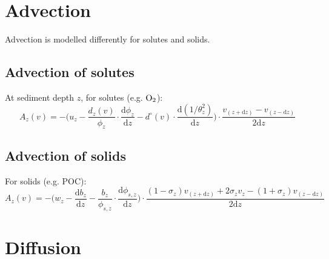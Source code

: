 \documentclass[a4paper]{article}
\newcommand{\D}[1]{\mathrm{d}#1}
\newcommand{\dydx}[2]{\frac{\D{#1}}{\D{#2}}}
\begin{document}

\section{Advection}\label{sx:advection}

Advection is modelled differently for solutes and solids.


\subsection{Advection of solutes}

At sediment depth $z$, for solutes (e.g. $\ce{O2}$):
\begin{equation}
A_z(v) = -\Bigg( u_z - \frac{d_z(v)}{\phi_z} \cdot \dydx{\phi_z}{z} - d^\circ(v) \cdot \dydx{(1/\theta_z^2)}{z} \Bigg) \cdot \frac{v_{(z+\D{z})} - v_{(z-\D{z})}}{2\D{z}}
\end{equation}


\subsection{Advection of solids}

For solids (e.g. POC):
\begin{equation}
A_z(v) = -\Bigg( w_z - \dydx{b_z}{z} - \frac{b_z}{\phi_{s,z}} \cdot \dydx{\phi_{s,z}}{z} \Bigg) \cdot \frac{(1 - \sigma_z) v_{(z+\D{z})} + 2 \sigma_z v_z - (1 + \sigma_z) v_{(z-\D{z})}}{2\D{z}}
\end{equation}


\section{Diffusion}\label{sx:diffusion}
\end{document}
